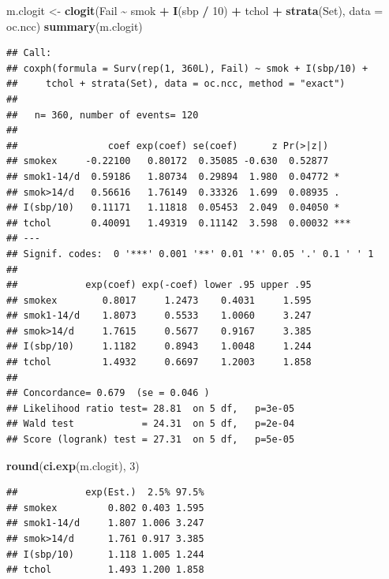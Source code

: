 \documentclass[
]{book}
\newenvironment{Shaded}{\begin{snugshade}}{\end{snugshade}}
\newcommand{\AttributeTok}[1]{\textcolor[rgb]{0.13,0.29,0.53}{#1}}
\newcommand{\DecValTok}[1]{\textcolor[rgb]{0.00,0.00,0.81}{#1}}
\newcommand{\FunctionTok}[1]{\textcolor[rgb]{0.13,0.29,0.53}{\textbf{#1}}}
\newcommand{\NormalTok}[1]{#1}
\newcommand{\OtherTok}[1]{\textcolor[rgb]{0.56,0.35,0.01}{#1}}
\newcommand{\SpecialCharTok}[1]{\textcolor[rgb]{0.81,0.36,0.00}{\textbf{#1}}}
\begin{document}
\begin{Shaded}
\begin{Highlighting}[]
\NormalTok{m.clogit }\OtherTok{\textless{}{-}} \FunctionTok{clogit}\NormalTok{(Fail }\SpecialCharTok{\textasciitilde{}}\NormalTok{ smok }\SpecialCharTok{+} \FunctionTok{I}\NormalTok{(sbp }\SpecialCharTok{/} \DecValTok{10}\NormalTok{) }\SpecialCharTok{+}\NormalTok{ tchol }\SpecialCharTok{+}
  \FunctionTok{strata}\NormalTok{(Set), }\AttributeTok{data =}\NormalTok{ oc.ncc)}
\FunctionTok{summary}\NormalTok{(m.clogit)}
\end{Highlighting}
\end{Shaded}

\begin{verbatim}
## Call:
## coxph(formula = Surv(rep(1, 360L), Fail) ~ smok + I(sbp/10) + 
##     tchol + strata(Set), data = oc.ncc, method = "exact")
## 
##   n= 360, number of events= 120 
## 
##                coef exp(coef) se(coef)      z Pr(>|z|)    
## smokex     -0.22100   0.80172  0.35085 -0.630  0.52877    
## smok1-14/d  0.59186   1.80734  0.29894  1.980  0.04772 *  
## smok>14/d   0.56616   1.76149  0.33326  1.699  0.08935 .  
## I(sbp/10)   0.11171   1.11818  0.05453  2.049  0.04050 *  
## tchol       0.40091   1.49319  0.11142  3.598  0.00032 ***
## ---
## Signif. codes:  0 '***' 0.001 '**' 0.01 '*' 0.05 '.' 0.1 ' ' 1
## 
##            exp(coef) exp(-coef) lower .95 upper .95
## smokex        0.8017     1.2473    0.4031     1.595
## smok1-14/d    1.8073     0.5533    1.0060     3.247
## smok>14/d     1.7615     0.5677    0.9167     3.385
## I(sbp/10)     1.1182     0.8943    1.0048     1.244
## tchol         1.4932     0.6697    1.2003     1.858
## 
## Concordance= 0.679  (se = 0.046 )
## Likelihood ratio test= 28.81  on 5 df,   p=3e-05
## Wald test            = 24.31  on 5 df,   p=2e-04
## Score (logrank) test = 27.31  on 5 df,   p=5e-05
\end{verbatim}

\begin{Shaded}
\begin{Highlighting}[]
\FunctionTok{round}\NormalTok{(}\FunctionTok{ci.exp}\NormalTok{(m.clogit), }\DecValTok{3}\NormalTok{)}
\end{Highlighting}
\end{Shaded}

\begin{verbatim}
##            exp(Est.)  2.5% 97.5%
## smokex         0.802 0.403 1.595
## smok1-14/d     1.807 1.006 3.247
## smok>14/d      1.761 0.917 3.385
## I(sbp/10)      1.118 1.005 1.244
## tchol          1.493 1.200 1.858
\end{verbatim}
\end{document}
